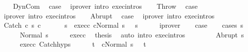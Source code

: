 \begin{isabellebody}
\isamarkupfalse%
\isanewline
\ \ \isamarkupfalse%
\ DynCom\ \isamarkupfalse%
\ {\isacharquery}case\ \isamarkupfalse%
\ {\isacharparenleft}iprover\ intro{\isacharcolon}\ exec{\isachardot}intros{\isacharparenright}\isanewline
{}\isamarkupfalse%
\isanewline
\ \ \isamarkupfalse%
\ Throw\ \isamarkupfalse%
\ {\isacharquery}case\ \isamarkupfalse%
\ {\isacharparenleft}iprover\ intro{\isacharcolon}\ exec{\isachardot}intros{\isacharparenright}\isanewline
{}\isamarkupfalse%
\isanewline
\ \ \isamarkupfalse%
\ Abrupt\ \isamarkupfalse%
\ {\isacharquery}case\ \isamarkupfalse%
\ {\isacharparenleft}iprover\ intro{\isacharcolon}\ exec{\isachardot}intros{\isacharparenright}\ \isanewline
{}\isamarkupfalse%
\isanewline
\ \ \isamarkupfalse%
\ {\isacharparenleft}Catch\ c{}\ s\ c{}{\isacharparenright}\ \isanewline
\ \ \isamarkupfalse%
\ \isamarkupfalse%
\ s{\isacharprime}\ \ exec{\isacharunderscore}c{}{\isacharcolon}\ {\isachardoublequoteopen}{\isasymGamma}{\isasymturnstile}{\isasymlangle}c{}{\isacharcomma}Normal\ s\ {\isasymrangle}\ {\isasymRightarrow}\ s{\isacharprime}{\isachardoublequoteclose}\isanewline
\ \ \ \ \isamarkupfalse%
\ iprover\isanewline
\ \ \isamarkupfalse%
\ {\isacharquery}case\isanewline
\ \ \isamarkupfalse%
\ {\isacharparenleft}cases\ s{\isacharprime}{\isacharparenright}\isanewline
\ \ \ \ \isamarkupfalse%
\ {\isacharparenleft}Normal\ s{\isacharprime}{\isacharprime}{\isacharparenright}\isanewline
\ \ \ \ \isamarkupfalse%
\ exec{\isacharunderscore}c{}\ \isamarkupfalse%
\ {\isacharquery}thesis\ \isamarkupfalse%
\ {\isacharparenleft}auto\ intro{\isacharbang}{\isacharcolon}\ exec{\isachardot}intros{\isacharparenright}\isanewline
\ \ \isamarkupfalse%
\isanewline
\ \ \ \ \isamarkupfalse%
\ {\isacharparenleft}Abrupt\ s{\isacharprime}{\isacharprime}{\isacharparenright}\isanewline
\ \ \ \ \isamarkupfalse%
\ exec{\isacharunderscore}c{}\ Catch{\isachardot}hyps\isanewline
\ \ \ \ \isamarkupfalse%
\ t\ \ {\isachardoublequoteopen}{\isasymGamma}{\isasymturnstile}{\isasymlangle}c{}{\isacharcomma}Normal\ s{\isacharprime}{\isacharprime}\ {\isasymrangle}\ {\isasymRightarrow}\ t{\isachardoublequoteclose}\isanewline

\end{isabellebody}
